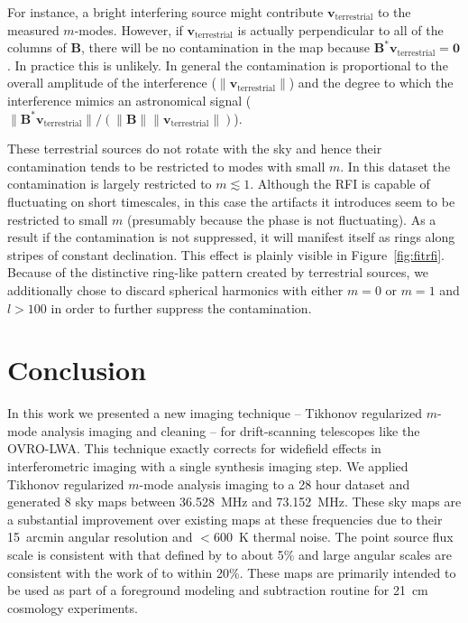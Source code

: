 \documentclass[twocolumn]{aastex61}
\renewcommand{\b}{\pmb}
\begin{document}
For instance, a bright interfering source might contribute $\b v_\text{terrestrial}$ to the measured
$m$-modes. However, if $\b v_\text{terrestrial}$ is actually perpendicular to all of the columns of
$\b B$, there will be no contamination in the map because $\b B^*\b v_\text{terrestrial} = \b 0$.
In practice this is unlikely. In general the contamination is proportional to the overall amplitude
of the interference ($\|\b v_\text{terrestrial}\|$) and the degree to which the interference mimics
an astronomical signal ($\|\b B^*\b v_\text{terrestrial}\|/(\|\b B\|\|\b v_\text{terrestrial}\|)$).

These terrestrial sources do not rotate with the sky and hence their contamination tends to be
restricted to modes with small $m$. In this dataset the contamination is largely restricted to $m
\lesssim 1$. Although the RFI is capable of fluctuating on short timescales, in this case the
artifacts it introduces seem to be restricted to small $m$ (presumably because the phase is not
fluctuating).  As a result if the contamination is not suppressed, it will manifest itself as rings
along stripes of constant declination. This effect is plainly visible in Figure~\ref{fig:fitrfi}.
Because of the distinctive ring-like pattern created by terrestrial sources, we additionally chose
to discard spherical harmonics with either $m=0$ or $m=1$ and $l>100$ in order to further suppress
the contamination.

\section{Conclusion}\label{sec:conclusion}

In this work we presented a new imaging technique -- Tikhonov regularized $m$-mode analysis imaging
and cleaning -- for drift-scanning telescopes like the OVRO-LWA.  This technique exactly corrects
for widefield effects in interferometric imaging with a single synthesis imaging step.  We applied
Tikhonov regularized $m$-mode analysis imaging to a 28 hour dataset and generated 8 sky maps between
36.528~MHz and 73.152~MHz.  These sky maps are a substantial improvement over existing maps at these
frequencies due to their 15~arcmin angular resolution and $<600$~K thermal noise. The point source
flux scale is consistent with that defined by \citet{2012MNRAS.423L..30S} to about 5\% and large
angular scales are consistent with the work of \citet{2011A&A...525A.138G} to within 20\%.  These
maps are primarily intended to be used as part of a foreground modeling and subtraction routine for
21~cm cosmology experiments.
\end{document}
